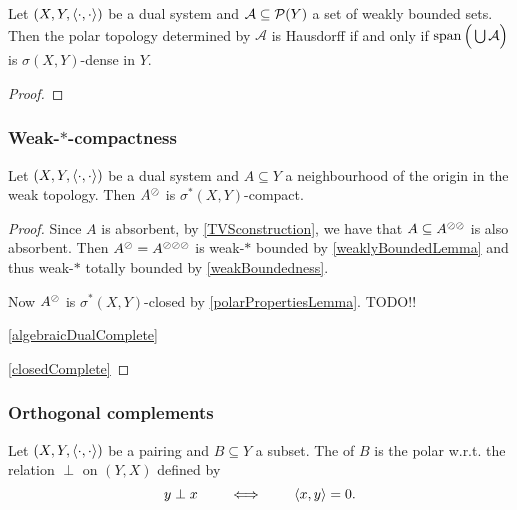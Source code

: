 \begin{proposition}
Let $\left( X,Y,\left\langle \cdot,\cdot \right\rangle \right)$ be a dual system and  $\mathcal{A}\subseteq\operatorname{\mathcal{P}}(Y)$ a set of weakly bounded sets. Then the polar topology determined by $\mathcal{A}$ is Hausdorff \textup{if and only if} $\operatorname{span}\Big(\bigcup \mathcal{A}\Big)$ is $\sigma(X,Y)$-dense in $Y$.
\end{proposition}
\begin{proof}

\end{proof}

\subsubsection{Weak-$*$-compactness}
\begin{theorem}
Let $(X,Y,\left\langle \cdot,\cdot \right\rangle)$ be a dual system and $A\subseteq Y$ a neighbourhood of the origin in the weak topology. Then $A^\oslash$ is $\sigma^*(X,Y)$-compact.
\end{theorem}
\begin{proof}
Since $A$ is absorbent, by \ref{TVSconstruction}, we have that $A\subseteq A^{\oslash\oslash}$ is also absorbent. Then $A^\oslash = A^{\oslash\oslash\oslash}$ is weak-$*$ bounded by \ref{weaklyBoundedLemma} and thus weak-$*$ totally bounded by \ref{weakBoundedness}.

Now $A^\oslash$ is $\sigma^*(X,Y)$-closed by \ref{polarPropertiesLemma}. TODO!!

\ref{algebraicDualComplete}

\ref{closedComplete}
\end{proof}

\subsubsection{Orthogonal complements}
\begin{definition}
Let $\left( X,Y,\left\langle \cdot,\cdot \right\rangle \right)$ be a pairing and $B\subseteq Y$ a subset. The  of $B$ is the polar w.r.t. the relation $\perp$ on $(Y,X)$ defined by
\[ y\perp x \qquad\iff\qquad \left\langle x, y \right\rangle = 0. \]
\end{definition}

